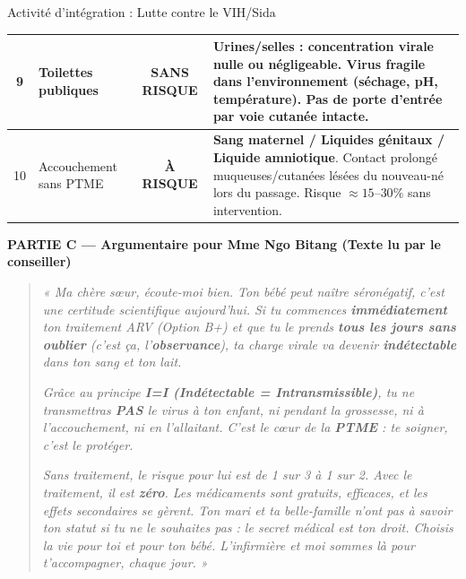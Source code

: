 \documentclass[11pt]{article}
\begin{document}
\begin{exoresolu}{Activité d'intégration : Lutte contre le VIH/Sida}
\begin{center}
\begin{tabularx}{\linewidth}{|c|X|c|X|}
\hline
9 & Toilettes publiques & \textbf{SANS RISQUE} & Urines/selles : concentration virale nulle ou négligeable. Virus fragile dans l'environnement (séchage, pH, température). Pas de porte d'entrée par voie cutanée intacte. \\
\hline
10 & Accouchement sans PTME & \textbf{À RISQUE} & \textbf{Sang maternel / Liquides génitaux / Liquide amniotique}. Contact prolongé muqueuses/cutanées lésées du nouveau-né lors du passage. Risque $\approx 15$--$30\%$ sans intervention. \\
\hline
\end{tabularx}
\end{center}

\textbf{PARTIE C — Argumentaire pour Mme Ngo Bitang (Texte lu par le conseiller)}

\begin{quote}
\textit{« Ma chère sœur, écoute-moi bien. Ton bébé peut naître séronégatif, c'est une certitude scientifique aujourd'hui. Si tu commences \textbf{immédiatement} ton traitement ARV (Option B+) et que tu le prends \textbf{tous les jours sans oublier} (c'est ça, l'\textbf{observance}), ta charge virale va devenir \textbf{indétectable} dans ton sang et ton lait.}

\textit{Grâce au principe \textbf{I=I (Indétectable = Intransmissible)}, tu ne transmettras \textbf{PAS} le virus à ton enfant, ni pendant la grossesse, ni à l'accouchement, ni en l'allaitant. C'est le cœur de la \textbf{PTME} : te soigner, c'est le protéger.}

\textit{Sans traitement, le risque pour lui est de 1 sur 3 à 1 sur 2. Avec le traitement, il est \textbf{zéro}. Les médicaments sont gratuits, efficaces, et les effets secondaires se gèrent. Ton mari et ta belle-famille n'ont pas à savoir ton statut si tu ne le souhaites pas : le secret médical est ton droit. Choisis la vie pour toi et pour ton bébé. L'infirmière et moi sommes là pour t'accompagner, chaque jour. »}
\end{quote}


\end{exoresolu}
\end{document}
